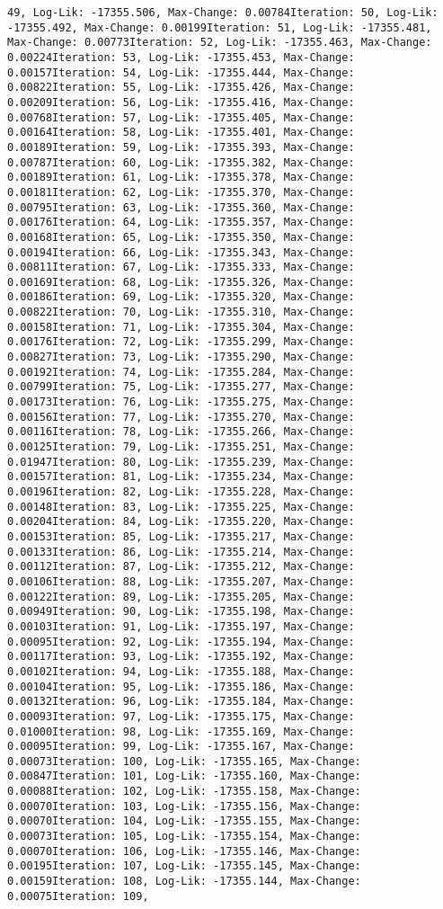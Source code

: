 \documentclass[
]{article}
\begin{document}
\begin{verbatim}
49, Log-Lik: -17355.506, Max-Change: 0.00784Iteration: 50, Log-Lik: -17355.492, Max-Change: 0.00199Iteration: 51, Log-Lik: -17355.481, Max-Change: 0.00773Iteration: 52, Log-Lik: -17355.463, Max-Change: 0.00224Iteration: 53, Log-Lik: -17355.453, Max-Change: 0.00157Iteration: 54, Log-Lik: -17355.444, Max-Change: 0.00822Iteration: 55, Log-Lik: -17355.426, Max-Change: 0.00209Iteration: 56, Log-Lik: -17355.416, Max-Change: 0.00768Iteration: 57, Log-Lik: -17355.405, Max-Change: 0.00164Iteration: 58, Log-Lik: -17355.401, Max-Change: 0.00189Iteration: 59, Log-Lik: -17355.393, Max-Change: 0.00787Iteration: 60, Log-Lik: -17355.382, Max-Change: 0.00189Iteration: 61, Log-Lik: -17355.378, Max-Change: 0.00181Iteration: 62, Log-Lik: -17355.370, Max-Change: 0.00795Iteration: 63, Log-Lik: -17355.360, Max-Change: 0.00176Iteration: 64, Log-Lik: -17355.357, Max-Change: 0.00168Iteration: 65, Log-Lik: -17355.350, Max-Change: 0.00194Iteration: 66, Log-Lik: -17355.343, Max-Change: 0.00811Iteration: 67, Log-Lik: -17355.333, Max-Change: 0.00169Iteration: 68, Log-Lik: -17355.326, Max-Change: 0.00186Iteration: 69, Log-Lik: -17355.320, Max-Change: 0.00822Iteration: 70, Log-Lik: -17355.310, Max-Change: 0.00158Iteration: 71, Log-Lik: -17355.304, Max-Change: 0.00176Iteration: 72, Log-Lik: -17355.299, Max-Change: 0.00827Iteration: 73, Log-Lik: -17355.290, Max-Change: 0.00192Iteration: 74, Log-Lik: -17355.284, Max-Change: 0.00799Iteration: 75, Log-Lik: -17355.277, Max-Change: 0.00173Iteration: 76, Log-Lik: -17355.275, Max-Change: 0.00156Iteration: 77, Log-Lik: -17355.270, Max-Change: 0.00116Iteration: 78, Log-Lik: -17355.266, Max-Change: 0.00125Iteration: 79, Log-Lik: -17355.251, Max-Change: 0.01947Iteration: 80, Log-Lik: -17355.239, Max-Change: 0.00157Iteration: 81, Log-Lik: -17355.234, Max-Change: 0.00196Iteration: 82, Log-Lik: -17355.228, Max-Change: 0.00148Iteration: 83, Log-Lik: -17355.225, Max-Change: 0.00204Iteration: 84, Log-Lik: -17355.220, Max-Change: 0.00153Iteration: 85, Log-Lik: -17355.217, Max-Change: 0.00133Iteration: 86, Log-Lik: -17355.214, Max-Change: 0.00112Iteration: 87, Log-Lik: -17355.212, Max-Change: 0.00106Iteration: 88, Log-Lik: -17355.207, Max-Change: 0.00122Iteration: 89, Log-Lik: -17355.205, Max-Change: 0.00949Iteration: 90, Log-Lik: -17355.198, Max-Change: 0.00103Iteration: 91, Log-Lik: -17355.197, Max-Change: 0.00095Iteration: 92, Log-Lik: -17355.194, Max-Change: 0.00117Iteration: 93, Log-Lik: -17355.192, Max-Change: 0.00102Iteration: 94, Log-Lik: -17355.188, Max-Change: 0.00104Iteration: 95, Log-Lik: -17355.186, Max-Change: 0.00132Iteration: 96, Log-Lik: -17355.184, Max-Change: 0.00093Iteration: 97, Log-Lik: -17355.175, Max-Change: 0.01000Iteration: 98, Log-Lik: -17355.169, Max-Change: 0.00095Iteration: 99, Log-Lik: -17355.167, Max-Change: 0.00073Iteration: 100, Log-Lik: -17355.165, Max-Change: 0.00847Iteration: 101, Log-Lik: -17355.160, Max-Change: 0.00088Iteration: 102, Log-Lik: -17355.158, Max-Change: 0.00070Iteration: 103, Log-Lik: -17355.156, Max-Change: 0.00070Iteration: 104, Log-Lik: -17355.155, Max-Change: 0.00073Iteration: 105, Log-Lik: -17355.154, Max-Change: 0.00070Iteration: 106, Log-Lik: -17355.146, Max-Change: 0.00195Iteration: 107, Log-Lik: -17355.145, Max-Change: 0.00159Iteration: 108, Log-Lik: -17355.144, Max-Change: 0.00075Iteration: 109, 
\end{verbatim}
\end{document}
